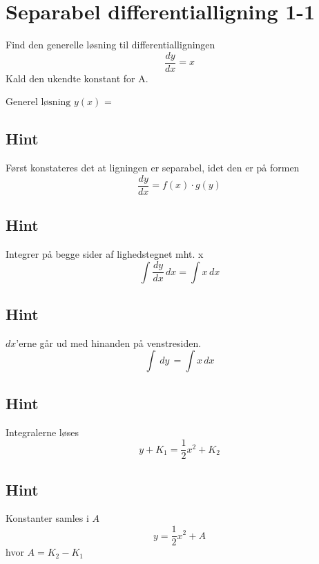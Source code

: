 \documentclass{article}
\newenvironment{exercise}[1]{\newpage\section{#1}}{}
\newcommand{\answerbox}[1]{\fbox{$#1$}}
\newcommand{\hint}{\subsection*{Hint}}
\begin{document}
\tableofcontents
\newpage

\begin{exercise}{Separabel differentialligning 1-1}


Find den generelle løsning til differentialligningen 
\[
\frac{dy}{dx} = x 
\]
Kald den ukendte konstant for A.

$\textrm{Generel løsning } y(x)$ = \answerbox{\frac{1}{2}x^2 + A}

\hint

Først konstateres det at ligningen er separabel, idet den er på formen
\[
\frac{dy}{dx} = f(x) \cdot g(y)
\]


\hint

Integrer på begge sider af lighedstegnet mht. x
\[
\int\frac{dy}{dx}\, dx= \int x\,dx
\]

\hint

$dx$'erne går ud med hinanden på venstresiden.
\[
\int\ dy\,= \int x\,dx
\]

\hint

Integralerne løses
\[
y + K_1 = \frac{1}{2} x^2 + K_2
\]


\hint

Konstanter samles i $A$
\[
y = \frac{1}{2}x^2 + A
\]
hvor $A=K_2-K_1$

\end{exercise}


\newpage
\end{document}

